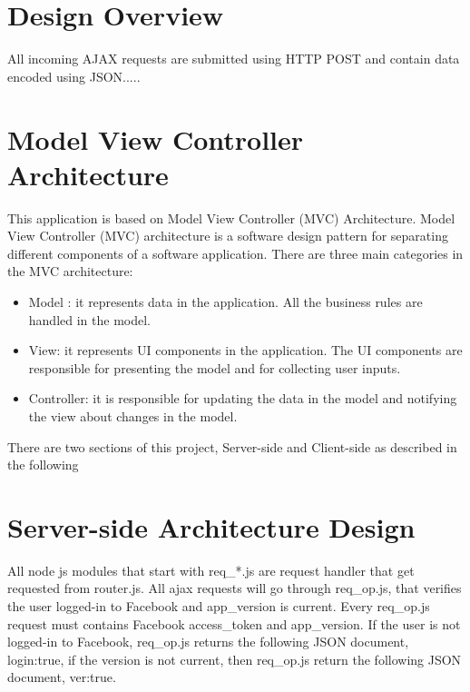 
\section{Design Overview}
All incoming AJAX requests are submitted using HTTP POST and contain data encoded using JSON..... 

\section{Model View Controller Architecture}
This application is based on Model View Controller (MVC) Architecture. Model View Controller (MVC) architecture is a software design pattern for separating different components of a software application.  \cite{MVC} There are three main categories
in the MVC architecture:

\begin{itemize}
\item Model : it represents data in the application. All the business rules are handled in the model.
\item View: it represents UI components in the application. The UI components are responsible for presenting the model and for collecting user inputs.
\item Controller: it is responsible for updating the data in the model and notifying the view about changes in the model.
\end{itemize}

There are two sections of this project, Server-side and Client-side as described in the following

\section{Server-side Architecture Design}

All node js modules that start with req{\_}*.js are request handler that get requested from router.js. All ajax requests will go through req{\_}op.js, that verifies the user logged-in to Facebook and app{\_}version is current. Every req{\_}op.js request must contains Facebook access{\_}token and app{\_}version. If the user is not logged-in to Facebook, req{\_}op.js returns the following JSON document, {login:true}, if the version is not current, then req{\_}op.js return the following JSON document, {ver:true}. 

